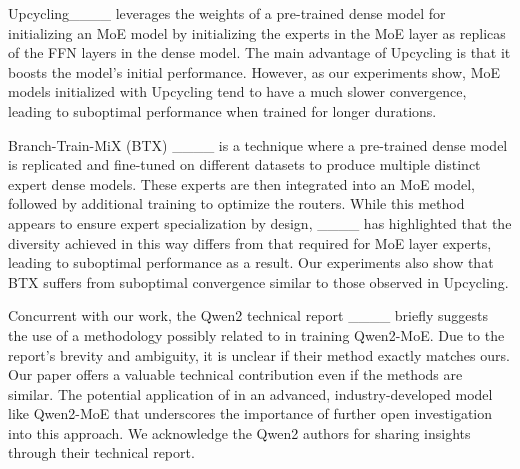 Upcycling____ leverages the weights of a pre-trained dense model for initializing an MoE model by initializing the experts in the MoE layer as replicas of the FFN layers in the dense model.
The main advantage of Upcycling is that it boosts the model's initial performance.  However, as our experiments show, MoE models initialized with Upcycling tend to have a much slower convergence, leading to suboptimal performance when trained for longer durations.



Branch-Train-MiX (BTX) ____ is a technique where a pre-trained dense model is replicated and fine-tuned on different datasets to produce multiple distinct expert dense models. These experts are then integrated into an MoE model, followed by additional training to optimize the routers. While this method appears to ensure expert specialization by design, ____ has highlighted that the diversity achieved in this way differs from that required for MoE layer experts, leading to suboptimal performance as a result. Our experiments also show that BTX suffers from suboptimal convergence similar to those observed in Upcycling.






Concurrent with our work, the Qwen2 technical report ____ briefly suggests the use of a methodology possibly related to \methodname{} in training Qwen2-MoE. Due to the report's brevity and ambiguity, it is unclear if their method exactly matches ours. 
Our paper offers a valuable technical contribution even if the methods are similar. 
The potential application of \methodname{} in an advanced, industry-developed model like Qwen2-MoE that underscores the importance of further open investigation into this approach. We acknowledge the Qwen2 authors for sharing insights through their technical report.